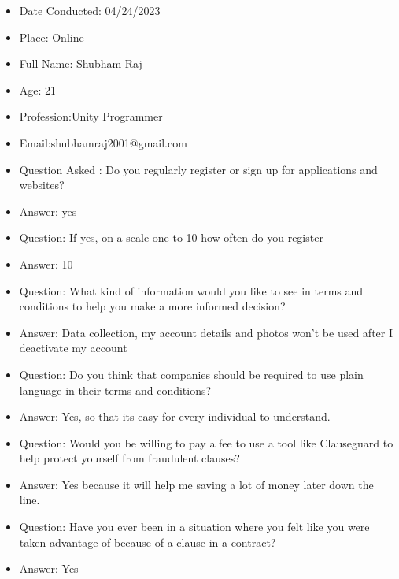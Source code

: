 \begin{itemize}
\item Date Conducted: 04/24/2023
\item Place: Online
    \item Full Name: Shubham Raj

    \item Age: 21

    \item Profession:Unity Programmer 

    \item Email:shubhamraj2001@gmail.com

    \item Question Asked : Do you regularly register or sign up for applications and websites?

    \item Answer: yes

    \item Question: If yes, on a scale one to 10 how often do you register
    \item Answer: 10

    \item Question: What kind of information would you like to see in terms and conditions to help you make a more informed decision?

    \item Answer: Data collection, my account details and photos won't be used after I deactivate my account

    \item Question: Do you think that companies should be required to use plain language in their terms and conditions?

    \item Answer: Yes, so that its easy for every individual to understand. 

    \item Question: Would you be willing to pay a fee to use a tool like Clauseguard to help protect yourself from fraudulent clauses?

    \item Answer: Yes because it will help me saving a lot of money later down the line. 

    \item Question: Have you ever been in a situation where you felt like you were taken advantage of because of a clause in a contract?

    \item Answer: Yes


\end{itemize}

